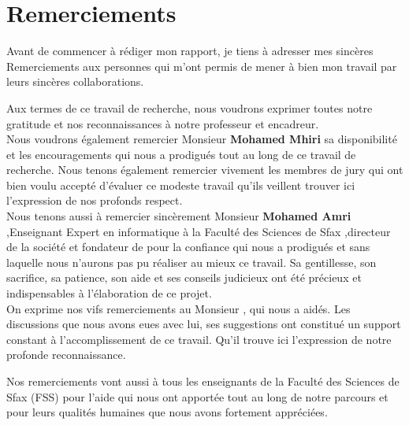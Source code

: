 \section*{Remerciements}

\vspace{0.9in}
\begin{center}

    Avant de commencer à rédiger mon rapport, je tiens à adresser mes sincères
    Remerciements aux personnes qui m'ont permis de mener à bien mon travail
    par leurs sincères collaborations.

    Aux termes de ce travail de recherche, nous voudrons exprimer toutes notre
    gratitude et nos reconnaissances à notre professeur et encadreur.
    \\[0.2in]
    Nous voudrons également remercier Monsieur \textbf{Mohamed Mhiri} sa disponibilité et les
    encouragements qui nous a prodigués tout au long de ce travail de
    recherche.  Nous tenons également remercier vivement les membres de jury
    qui ont bien voulu accepté d'évaluer ce modeste travail qu'ils veillent
    trouver ici l'expression de nos profonds respect.
    \\[0.2in]
 Nous tenons aussi à remercier sincèrement Monsieur\textbf{ Mohamed Amri} ,Enseignant Expert en informatique à
 la Faculté des Sciences de Sfax ,directeur de la société    et fondateur de 
pour la confiance qui nous a prodigués et sans laquelle nous n’aurons pas pu réaliser
au mieux ce travail. Sa gentillesse, son sacrifice, sa patience, son aide et ses conseils
judicieux ont été précieux et indispensables à l’élaboration de ce projet.
  \\[0.2in]
   On exprime nos vifs remerciements au Monsieur , qui nous a aidés.
Les discussions que nous avons eues avec lui, ses suggestions ont constitué un support
constant à l’accomplissement de ce travail. Qu'il trouve ici l'expression de notre
profonde reconnaissance.

    Nos remerciements vont aussi à tous les enseignants de la Faculté des Sciences
de Sfax (FSS) pour l’aide qui nous ont apportée tout au long de notre parcours et
pour leurs qualités humaines que nous avons fortement appréciées.

\end{center}
